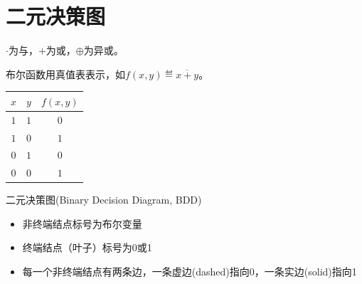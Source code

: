 
\section{二元决策图}
$\cdot$为与，$+$为或，$\oplus$为异或。

布尔函数用真值表表示，如$f(x,y)\eqdef\overline{x+y}$。
\begin{center}
\begin{tabular}{cc|c}
$x$ & $y$ & $f(x,y)$\\\hline
$1$ & $1$ & $0$ \\
$1$ & $0$ & $1$ \\
$0$ & $1$ & $0$ \\
$0$ & $0$ & $1$
\end{tabular}
\end{center}

二元决策图(Binary Decision Diagram, BDD)
\begin{itemize}
	\item 非终端结点标号为布尔变量
	\item 终端结点（叶子）标号为0或1
	\item 每一个非终端结点有两条边，一条虚边(dashed)指向0，一条实边(solid)指向1
\end{itemize}

